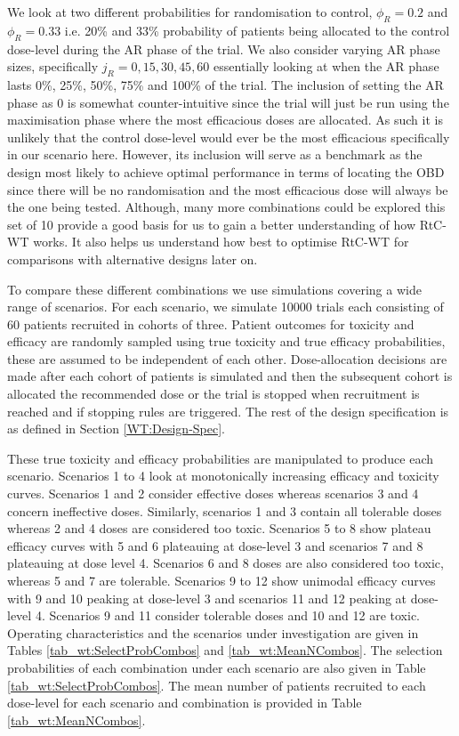  We look at two different probabilities for randomisation to control, $\phi_R = 0.2$ and $\phi_R = 0.33$ i.e. 20\% and 33\% probability of patients being allocated to the control dose-level during the AR phase of the trial. We also consider varying AR phase sizes, specifically $j_R = 0, 15, 30, 45 ,60$ essentially looking at when the AR phase lasts 0\%, 25\%, 50\%, 75\% and 100\% of the trial. The inclusion of setting the AR phase as 0 is somewhat counter-intuitive since the trial will just be run using the maximisation phase where the most efficacious doses are allocated. As such it is unlikely that the control dose-level would ever be the most efficacious specifically in our scenario here. However, its inclusion will serve as a benchmark as the design most likely to achieve optimal performance in terms of locating the OBD since there will be no randomisation and the most efficacious dose will always be the one being tested. Although, many more combinations could be explored this set of 10 provide a good basis for us to gain a better understanding of how RtC-WT works. It also helps us understand how best to optimise RtC-WT for comparisons with alternative designs later on.  
 
 To compare these different combinations we use simulations covering a wide range of scenarios. For each scenario, we simulate 10000 trials each consisting of 60 patients recruited in cohorts of three. Patient outcomes for toxicity and efficacy are randomly sampled using true toxicity and true efficacy probabilities, these are assumed to be independent of each other. Dose-allocation decisions are made after each cohort of patients is simulated and then the subsequent cohort is allocated the recommended dose or the trial is stopped when recruitment is reached and if stopping rules are triggered. The rest of the design specification is as defined in Section \ref{WT:Design-Spec}. 
 
 These true toxicity and efficacy probabilities are manipulated to produce each scenario. Scenarios 1 to 4 look at monotonically increasing efficacy and toxicity curves. Scenarios 1 and 2 consider effective doses whereas scenarios 3 and 4 concern ineffective doses. Similarly, scenarios 1 and 3 contain all tolerable doses whereas 2 and 4 doses are considered too toxic. Scenarios 5 to 8 show plateau efficacy curves with 5 and 6 plateauing at dose-level 3 and scenarios 7 and 8 plateauing at dose level 4. Scenarios 6 and 8 doses are also considered too toxic, whereas 5 and 7 are tolerable. Scenarios 9 to 12 show unimodal efficacy curves with 9 and 10 peaking at dose-level 3 and scenarios 11 and 12 peaking at dose-level 4. Scenarios 9 and 11 consider tolerable doses and 10 and 12 are toxic. Operating characteristics and the scenarios under investigation are given in Tables \ref{tab_wt:SelectProbCombos} and \ref{tab_wt:MeanNCombos}. The selection probabilities of each combination under each scenario are also given in Table \ref{tab_wt:SelectProbCombos}. The mean number of patients recruited to each dose-level for each scenario and combination is provided in Table \ref{tab_wt:MeanNCombos}.  
 
